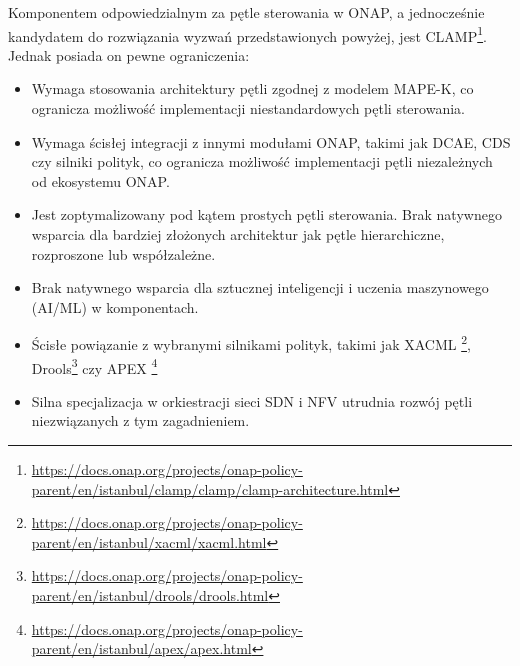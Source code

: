 Komponentem odpowiedzialnym za pętle sterowania w ONAP, a jednocześnie kandydatem do rozwiązania wyzwań przedstawionych powyżej, jest CLAMP\footnote{\url{https://docs.onap.org/projects/onap-policy-parent/en/istanbul/clamp/clamp/clamp-architecture.html}}. Jednak posiada on pewne ograniczenia:
\begin{itemize}
    \item Wymaga stosowania architektury pętli zgodnej z modelem MAPE-K, co ogranicza możliwość implementacji niestandardowych pętli sterowania.
    \item Wymaga ścisłej integracji z innymi modułami ONAP, takimi jak DCAE, CDS czy silniki polityk, co ogranicza możliwość implementacji pętli niezależnych od ekosystemu ONAP.
    \item Jest zoptymalizowany pod kątem prostych pętli sterowania. Brak natywnego wsparcia dla bardziej złożonych architektur jak pętle hierarchiczne, rozproszone lub współzależne.
    \item Brak natywnego wsparcia dla sztucznej inteligencji i uczenia maszynowego (AI/ML) w komponentach.
    \item Ścisłe powiązanie z wybranymi silnikami polityk, takimi jak XACML \footnote{\url{https://docs.onap.org/projects/onap-policy-parent/en/istanbul/xacml/xacml.html}}, Drools\footnote{\url{https://docs.onap.org/projects/onap-policy-parent/en/istanbul/drools/drools.html}} czy APEX \footnote{\url{https://docs.onap.org/projects/onap-policy-parent/en/istanbul/apex/apex.html}} 
    \item Silna specjalizacja w orkiestracji sieci SDN i NFV utrudnia rozwój pętli niezwiązanych z tym zagadnieniem.
\end{itemize}

